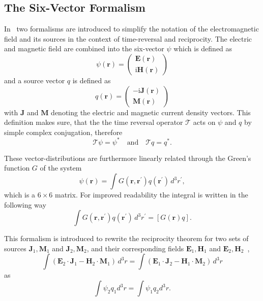 \subsection{The Six-Vector Formalism}
In~\parencite{de_rosny_theory_2010} two formalisms are introduced to simplify the notation of the electromagnetic field and its sources in the context of time-reversal and reciprocity.
The electric and magnetic field are combined into the  six-vector \(\psi \) which is defined as
\begin{equation}
    \psi(\bm{r}) = \begin{pmatrix}
        \bm{E}(\bm{r}) \\
        \mathrm{i} \bm{H}(\bm{r})
    \end{pmatrix}
\end{equation}
and a source vector \(q\) is defined as
\begin{equation}
    q(\bm{r}) = \begin{pmatrix}
        -\mathrm{i} \bm{J}(\bm{r}) \\
        \bm{M}(\bm{r})
    \end{pmatrix}
\end{equation}
with \(\bm{J}\) and \(\bm{M}\) denoting the electric and magnetic current density vectors.
This definition makes sure, that the the time reversal operator \(\mathcal{T}\) acts on \(\psi \) and \(q \) by simple complex conjugation, therefore
\begin{equation}
    \mathcal{T}\psi = \psi^* \quad \text{and} \quad \mathcal{T}q = q^*.
\end{equation}

These vector-distributions are furthermore linearly related through the Green's function \(G\) of the system
\begin{equation}
    \psi(\bm{r}) = \int G(\bm{r}, \bm{r}^{\prime}) q(\bm{r}^{\prime}) \, d^3 r^{\prime},
\end{equation}
which is a \(6 \times 6\) matrix.
For improved readability the integral is written in the following way
\begin{equation}
    \int G(\bm{r}, \bm{r}^{\prime}) q(\bm{r}^{\prime}) \, d^3 r^{\prime} = [G(\bm{r}) q].
\end{equation}

This formalism is introduced to rewrite the reciprocity theorem for two sets of sources \(\bm{J}_1, \bm{M}_1\) and \(\bm{J}_2, \bm{M}_2\), and their corresponding fields \(\bm{E}_1, \bm{H}_1\) and \(\bm{E}_2, \bm{H}_2\)~\parencite[p.~146]{balanis_antenna_2005},
\begin{equation}
    \int (\bm{E}_2 \cdot \bm{J}_1 - \bm{H}_2 \cdot \bm{M}_1) \, d^3 r = \int (\bm{E}_1 \cdot \bm{J}_2 - \bm{H}_1 \cdot \bm{M}_2) \, d^3 r
\end{equation}
as
\begin{equation}\label{eq:reciprocity_theorem}
    \int \psi_2 q_1 d^3 r = \int \psi_1 q_2 d^3 r.
\end{equation}

